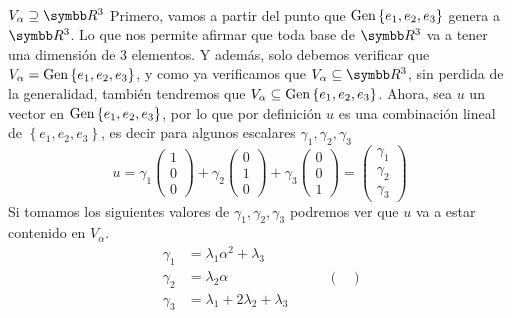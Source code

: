     \\
    \begin{mathcase}{\(V_\alpha \supseteq \realR^3\)}
        Primero, vamos a partir del punto que \(\text{Gen} \left\{ e_1, e_2, e_3 \right\}\) genera a \(\realR^3\). Lo que nos permite afirmar que toda base de \(\realR^3\) va a 
        tener una dimensión de 3 elementos. Y además, solo debemos verificar que \(V_\alpha = \text{Gen} \left\{ e_1, e_2, e_3 \right\}\), y como ya verificamos que \(V_\alpha \subseteq \realR^3\),
        sin perdida de la generalidad, también tendremos que \(V_\alpha \subseteq \text{Gen} \left\{ e_1, e_2, e_3 \right\}\).
        Ahora, sea \(u\) un vector en \(\text{Gen} \left\{ e_1, e_2, e_3 \right\}\), por lo que por definición \(u\) es una combinación lineal de \(\left\{e_1, e_2, e_3\right\}\), 
        es decir para algunos escalares \(\gamma_1, \gamma_2, \gamma_3\)
        \[
            u = 
            \gamma_1
            \begin{pmatrix}
                1 \\ 0 \\ 0
            \end{pmatrix}
            +
            \gamma_2
            \begin{pmatrix}
                0 \\ 1 \\ 0
            \end{pmatrix}
            +
            \gamma_3
            \begin{pmatrix}
                0 \\ 0 \\ 1
            \end{pmatrix}
            =
            \begin{pmatrix}
                \gamma_1 \\
                \gamma_2 \\
                \gamma_3
            \end{pmatrix}
        \]
        Si tomamos los siguientes valores de \(\gamma_1, \gamma_2, \gamma_3\) podremos ver que \(u\) va a estar contenido en \(V_\alpha\).
        \[
            \begin{aligned}
                \gamma_1 &= \lambda_1\alpha^2 + \lambda_3 \\
                \gamma_2 &= \lambda_2\alpha \\
                \gamma_3 &= \lambda_1 + 2\lambda_2 + \lambda_3
            \end{aligned}
            \hspace{1cm}
            \begin{pmatrix}

\end{pmatrix}\]
\end{mathcase}
